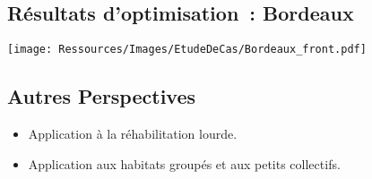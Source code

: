 \documentclass[xcolor=x11names, compress, 11pt]{beamer}
\begin{document}
\subsection{Résultats d’optimisation~: Bordeaux}
\begin{frame}[noframenumbering, c]
    \vfill
    \centering
    \begin{adjustwidth}{-2.2em}{-2.2em}
        \texttt{[image: Ressources/Images/EtudeDeCas/Bordeaux\_front.pdf]}
    \end{adjustwidth}
    \vfill
\end{frame}






\subsection{Autres Perspectives}
\begin{frame}[noframenumbering, c]
    \vfill
    \begin{itemize}
        \item Application à la réhabilitation lourde.
    \vfill
        \item<2-> Application aux habitats groupés et aux petits collectifs.
    \end{itemize}
    \vfill
\end{frame}





\end{document}

